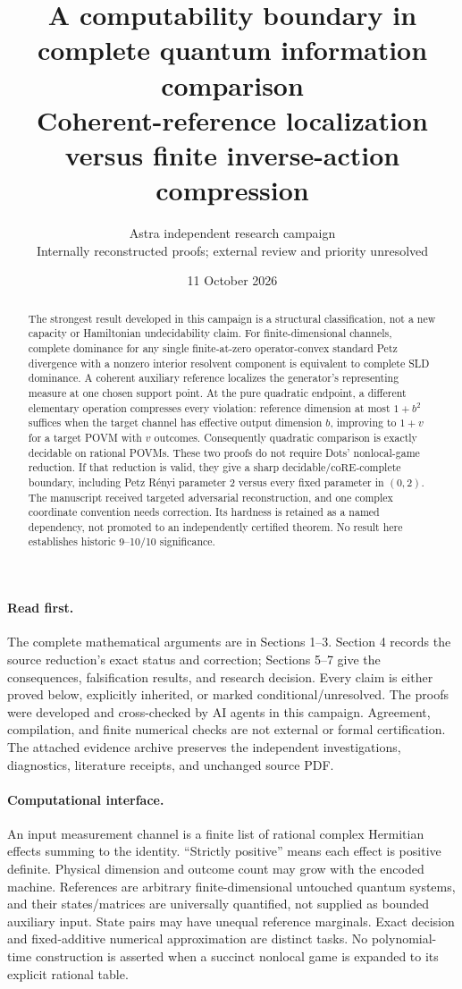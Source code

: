 \documentclass[11pt]{article}
\title{A computability boundary in complete quantum information comparison\\
\large Coherent-reference localization versus finite inverse-action compression}
\author{Astra independent research campaign\\\small Internally reconstructed proofs; external review and priority unresolved}
\date{11 October 2026}
\begin{document}
\maketitle
\begin{abstract}
The strongest result developed in this campaign is a structural classification,
not a new capacity or Hamiltonian undecidability claim. For finite-dimensional
channels, complete dominance for any single finite-at-zero operator-convex
standard Petz divergence with a nonzero interior resolvent component is
equivalent to complete SLD dominance. A coherent auxiliary reference localizes
the generator's representing measure at one chosen support point. At the pure
quadratic endpoint, a different elementary operation compresses every violation:
reference dimension at most $1+b^2$ suffices when the target channel has effective
output dimension $b$, improving to $1+v$ for a target POVM with $v$ outcomes.
Consequently quadratic comparison is exactly decidable on rational POVMs.
These two proofs do not require Dots' nonlocal-game reduction. If that reduction
is valid, they give a sharp decidable/\(\mathrm{coRE}\)-complete boundary, including
Petz R\'enyi parameter $2$ versus every fixed parameter in $(0,2)$.
The manuscript received targeted adversarial reconstruction, and one complex
coordinate convention needs correction. Its hardness is retained as a named
dependency, not promoted to an independently certified theorem. No result here
establishes historic 9--10/10 significance.
\end{abstract}

\paragraph{Read first.}
The complete mathematical arguments are in Sections 1--3. Section 4 records
the source reduction's exact status and correction; Sections 5--7 give the
consequences, falsification results, and research decision. Every claim is
either proved below, explicitly inherited, or marked conditional/unresolved.
The proofs were developed and cross-checked by AI agents in this campaign.
Agreement, compilation, and finite numerical checks are not external or formal
certification. The attached evidence archive preserves the independent
investigations, diagnostics, literature receipts, and unchanged source PDF.

\paragraph{Computational interface.}
An input measurement channel is a finite list of rational complex Hermitian
effects summing to the identity. ``Strictly positive'' means each effect is
positive definite. Physical dimension and outcome count may grow with the
encoded machine. References are arbitrary finite-dimensional untouched quantum
systems, and their states/matrices are universally quantified, not supplied as
bounded auxiliary input. State pairs may have unequal reference marginals.
Exact decision and fixed-additive numerical approximation are distinct tasks.
No polynomial-time construction is asserted when a succinct nonlocal game is
expanded to its explicit rational table.
\end{document}

